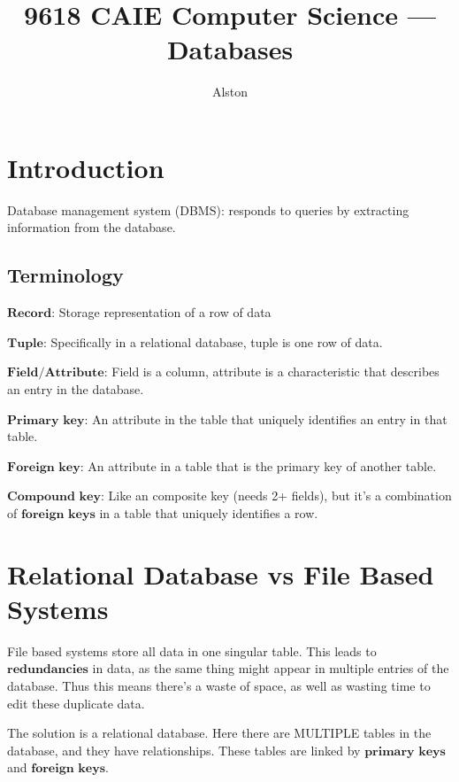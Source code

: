 \documentclass{article}
\title{9618 CAIE Computer Science — Databases}
\author{Alston}
\date{}
\theoremstyle{mytheoremstyle}
\theoremstyle{mytheoremstyle}
\theoremstyle{myproblemstyle}
\begin{document}
    \maketitle

    \section{Introduction}
    Database management system (DBMS): responds to queries by extracting information from the database.

    \subsection{Terminology}
    
    $\textbf{Record:}$ Storage representation of a row of data

    $\textbf{Tuple:}$ Specifically in a relational database, tuple is one row of data.

    $\textbf{Field/Attribute:}$ Field is a column, attribute is a characteristic that describes an entry in the database.

    $\textbf{Primary key:}$ An attribute in the table that uniquely identifies an entry in that table.

    $\textbf{Foreign key:}$ An attribute in a table that is the primary key of another table.
    
    $\textbf{Compound key:}$ Like an composite key (needs 2+ fields), but it's a combination of $\textbf{foreign keys}$ in a table that uniquely identifies a row.

    \section{Relational Database vs File Based Systems}

    File based systems store all data in one singular table. This leads to $\textbf{redundancies}$ in data, as the same thing might appear in multiple entries of the database. Thus this means there's a waste of space, as well as wasting time to edit these duplicate data.

    The solution is a relational database. Here there are MULTIPLE tables in the database, and they have relationships. These tables are linked by $\textbf{primary keys}$ and $\textbf{foreign keys}$.








    
\end{document}
